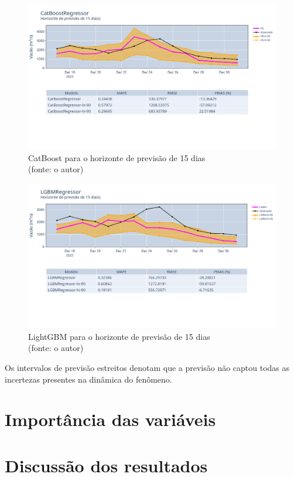 \begin{figure}[!h]
	\centering
	\includegraphics[scale=0.33]{Figuras/jequiti/resultados/CatBoostRegressor_fh15.png}
	\caption{CatBoost para o horizonte de previsão de 15 dias\\(fonte: o autor)}
	\label{fig:jequiti_CatBoostRegressor_fh15}
\end{figure}

\begin{figure}[!h]
	\centering
	\includegraphics[scale=0.33]{Figuras/jequiti/resultados/LGBMRegressor_fh15.png}
	\caption{LightGBM para o horizonte de previsão de 15 dias\\(fonte: o autor)}
	\label{fig:jequiti_LGBMRegressor_fh15}
\end{figure}
\clearpage

Os intervalos de previsão estreitos denotam que a previsão não captou todas as incertezas presentes na dinâmica do fenômeno.\cite{RobHyndman_prediction_intervals}

\section{Importância das variáveis}

\section{Discuss\~ao dos resultados}
